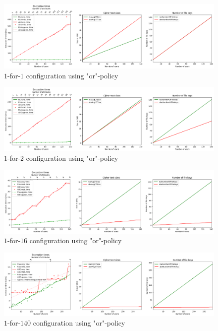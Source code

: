 \begin{figure}[!t]
\centering
    \includegraphics[width=\linewidth]{img/eval-or-policy/encrypt_incrementing_10_attribute_increment_1per1User.png}
    \caption{$1$-for-$1$ configuration using "or"-policy}
    \label{fig:1-for-infter1-or}
\end{figure}
\begin{figure}[!t]
\centering
    \includegraphics[width=\linewidth]{img/eval-or-policy/encrypt_incrementing_10_attribute_increment_1per2User.png}
    \caption{$1$-for-$2$ configuration using "or"-policy}
    \label{fig:1-for-2-or}
\end{figure}
\begin{figure}[!t]
\centering
    \includegraphics[width=\linewidth]{img/eval-or-policy/encrypt_incrementing_10_attribute_increment_1per16User.png}
    \caption{$1$-for-$16$ configuration using "or"-policy}
    \label{fig:1-for-16-or}
\end{figure}
\begin{figure}[!t]
\centering
    \includegraphics[width=\linewidth]{img/eval-or-policy/encrypt_incrementing_10_attribute_increment_1per140User.png}
    \caption{$1$-for-$140$ configuration using "or"-policy}
    \label{fig:1-for-140-or}
\end{figure}

